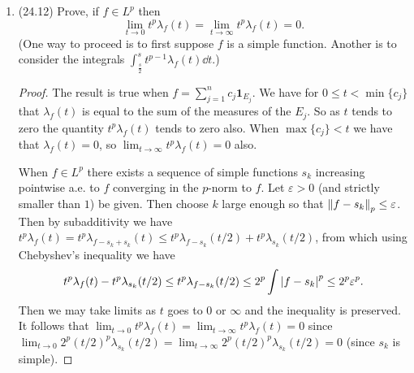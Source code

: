 \documentclass[11pt]{article}
\newcommand{\br}[1]{\left(#1\right)}
\begin{document}
\begin{enumerate}
\begin{proof}
      For $p_1$ finite and $0<\theta<1$ chosen so that $\frac{1}{p} = \frac{1-\theta}{p_0}+\frac{\theta}{p_1}$ observe that $\frac{1-\theta}{p_0}<\frac{1}{p}$ implies $\frac{p_0}{(1-\theta)p}>1$ and similarly we have that $\frac{p_1}{\theta p}>1$. Then $\abs{f}^{(1-\theta)p}\in L^{p_0/(1-\theta)p}$ since $f\in L^{p_0}$ and $\abs{f}^{\theta p}\in L^{p_1/\theta p}$ since $f\in L^{p_1}$: \[\int(\abs{f}^{(1-\theta)p})^{p_0/(1-\theta)p} = \int\abs{f}^{p_0}<\infty \quad\text{and}\quad \int(\abs{f}^{\theta p})^{p_1/\theta p} = \int\abs{f}^{p_1}<\infty.\] Then we use H\"older's inequality ($1 = \frac{1}{p_0/(1-\theta)p} + \frac{1}{p_1/\theta p}$) to obtain \[\norm{f}_p^p = \int\abs{f}^p = \int\abs{f}^{(1-\theta)p}\abs{f}^{\theta p}\leq \norm{\abs{f}^{(1-\theta)p}}_{p_0/(1-\theta)p} \norm{\abs{f}^{\theta p}}_{p_1/\theta p}<\infty,\] which implies $f\in L^p$. In the above estimate take $p$-th roots to obtain \[\norm{f}_p \leq \br{\int\abs{f}^{p_0}}^{\frac{1-\theta}{p_0}}\br{\int\abs{f}^{p_1}}^{\frac{\theta}{p_1}} =\norm{f}_{p_0}^{1-\theta}\norm{f}_{p_1}^\theta\] as needed.
    \end{proof}
    \item (24.12) Prove, if $f\in L^p$ then \[\lim_{t\to 0}t^p\lambda_f(t) = \lim_{t\to\infty}t^p\lambda_f(t) = 0.\] (One way to proceed is to first suppose $f$ is a simple function. Another is to consider the integrals $\int_{\frac{s}{2}}^s t^{p-1}\lambda_f(t)\dd{t}$.) \begin{proof}
      The result is true when $f = \sum_{j=1}^n c_j\mathbf{1}_{E_j}$. We have for $0\leq t< \min\{c_j\}$ that $\lambda_f(t)$ is equal to the sum of the measures of the $E_j$. So as $t$ tends to zero the quantity $t^p\lambda_f(t)$ tends to zero also. When $\max\{c_j\}<t$ we have that $\lambda_f(t) = 0$, so $\lim_{t\to\infty}t^p\lambda_f(t) = 0$ also.
      
      When $f\in L^p$ there exists a sequence of simple functions $s_k$ increasing pointwise a.e. to $f$ converging in the $p$-norm to $f$. Let $\varepsilon>0$ (and strictly smaller than $1$) be given. Then choose $k$ large enough so that $\norm{f-s_k}_p\leq \varepsilon$. Then by subadditivity we have $t^p\lambda_f(t) = t^p\lambda_{f-s_k+s_k}(t)\leq t^p\lambda_{f-s_k}(t/2)+ t^p\lambda_{s_k}(t/2)$, from which using Chebyshev's inequality we have \[t^p\lambda_f(t) - t^p\lambda_{s_k}(t/2)\leq t^p\lambda_{f-s_k}(t/2)\leq 2^p\int\abs{f-s_k}^p\leq 2^p\varepsilon^p.\] Then we may take limits as $t$ goes to $0$ or $\infty$ and the inequality is preserved. It follows that $\lim_{t\to 0}t^p\lambda_f(t) = \lim_{t\to\infty}t^p\lambda_f(t) = 0$ since $\lim_{t\to 0}2^p(t/2)^p\lambda_{s_k}(t/2) = \lim_{t\to\infty}2^p(t/2)^p\lambda_{s_k}(t/2) = 0$ (since $s_k$ is simple).
    \end{proof}
\end{enumerate}
\end{document}
